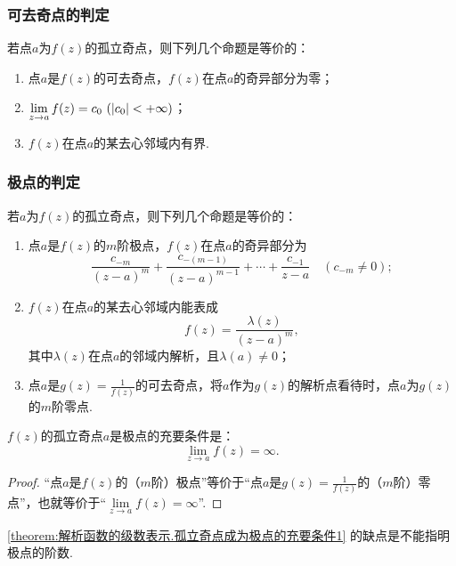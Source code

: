 \subsubsection{可去奇点的判定}
\begin{theorem}\label{theorem:解析函数的级数表示.可去奇点的特征}
若点\(a\)为\(f(z)\)的孤立奇点，则下列几个命题是等价的：
\begin{enumerate}
\item 点\(a\)是\(f(z)\)的可去奇点，\(f(z)\)在点\(a\)的奇异部分为零；
\item \(\lim\limits_{z \to a} f(z) = c_0\ (\abs{c_0} < +\infty)\)；
\item \(f(z)\)在点\(a\)的某去心邻域内有界.
\end{enumerate}
\end{theorem}

\subsubsection{极点的判定}
\begin{theorem}\label{theorem:解析函数的级数表示.极点的特征}
若\(a\)为\(f(z)\)的孤立奇点，则下列几个命题是等价的：
\begin{enumerate}
\item 点\(a\)是\(f(z)\)的\(m\)阶极点，\(f(z)\)在点\(a\)的奇异部分为\[
\frac{c_{-m}}{(z-a)^m} + \frac{c_{-(m-1)}}{(z-a)^{m-1}} + \dotsb + \frac{c_{-1}}{z-a}
\quad(c_{-m}\neq0);
\]

\item \(f(z)\)在点\(a\)的某去心邻域内能表成\[
f(z) = \frac{\lambda(z)}{(z-a)^m},
\]其中\(\lambda(z)\)在点\(a\)的邻域内解析，且\(\lambda(a)\neq0\)；

\item 点\(a\)是\(g(z) = \frac{1}{f(z)}\)的可去奇点，将\(a\)作为\(g(z)\)的解析点看待时，点\(a\)为\(g(z)\)的\(m\)阶零点.
\end{enumerate}
\end{theorem}

\begin{corollary}\label{theorem:解析函数的级数表示.孤立奇点成为极点的充要条件1}
\(f(z)\)的孤立奇点\(a\)是极点的充要条件是：\[
\lim\limits_{z \to a} f(z) = \infty.
\]
\begin{proof}
“点\(a\)是\(f(z)\)的（\(m\)阶）极点”等价于“点\(a\)是\(g(z) = \frac{1}{f(z)}\)的（\(m\)阶）零点”，也就等价于“\(\lim\limits_{z \to a} f(z) = \infty\)”.
\end{proof}
\end{corollary}
\cref{theorem:解析函数的级数表示.孤立奇点成为极点的充要条件1} 的缺点是不能指明极点的阶数.

